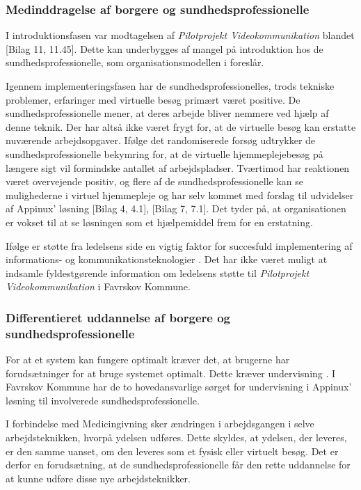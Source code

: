 \subsubsection{Medinddragelse af borgere og sundhedsprofessionelle}
I introduktionsfasen var modtagelsen af \textit{Pilotprojekt Videokommunikation} blandet [Bilag 11, 11.45]. Dette kan underbygges af mangel på introduktion hos de sundhedsprofessionelle, som organisationsmodellen i  foreslår. 

Igennem implementeringsfasen har de sundhedsprofessionelles, trods tekniske problemer, erfaringer med virtuelle besøg primært været positive. De sundhedsprofessionelle mener, at deres arbejde bliver nemmere ved hjælp af denne teknik. Der har altså ikke været frygt for, at de virtuelle besøg kan erstatte nuværende arbejdsopgaver. Ifølge det randomiserede forsøg  udtrykker de sundhedsprofessionelle bekymring for, at de virtuelle hjemmeplejebesøg på længere sigt vil formindske antallet af arbejdspladser. Tværtimod har reaktionen været overvejende positiv, og flere af de sundhedsprofessionelle kan se mulighederne i virtuel hjemmepleje og har selv kommet med forslag til udvidelser af Appinux' løsning [Bilag 4, 4.1], [Bilag 7, 7.1]. Det tyder på, at organisationen er vokset til at se løsningen som et hjælpemiddel frem for en erstatning.

Ifølge  er støtte fra ledelsens side en vigtig faktor for succesfuld implementering af informations- og kommunikationsteknologier \cite{Ikt}. Det har ikke været muligt at indsamle fyldestgørende information om ledelsens støtte til \textit{Pilotprojekt Videokommunikation} i Favrskov Kommune. 

\subsubsection{Differentieret uddannelse af borgere og sundhedsprofessionelle}
For at et system kan fungere optimalt kræver det, at brugerne har forudsætninger for at bruge systemet optimalt. Dette kræver undervisning \cite{Ikt}. I Favrskov Kommune har de to hovedansvarlige sørget for undervisning i Appinux' løsning til involverede sundhedsprofessionelle. 

I forbindelse med Medicingivning sker ændringen i arbejdsgangen i selve arbejdsteknikken, hvorpå ydelsen udføres. Dette skyldes, at ydelsen, der leveres, er den samme uanset, om den leveres som et fysisk eller virtuelt besøg. Det er derfor en forudsætning, at de sundhedsprofessionelle får den rette uddannelse for at kunne udføre disse nye arbejdsteknikker.  


